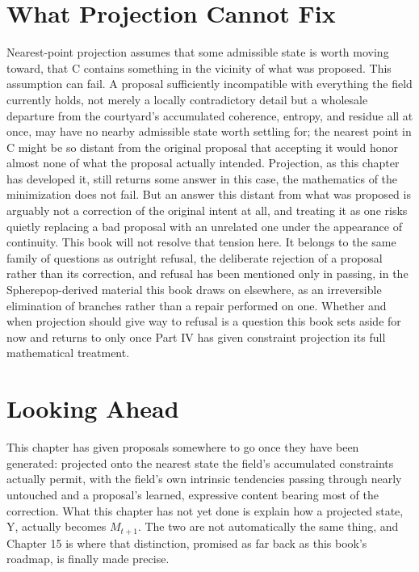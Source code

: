 \section{What Projection Cannot Fix}

Nearest-point projection assumes that some admissible state is worth moving toward, that C contains something in the vicinity of what was proposed. This assumption can fail. A proposal sufficiently incompatible with everything the field currently holds, not merely a locally contradictory detail but a wholesale departure from the courtyard's accumulated coherence, entropy, and residue all at once, may have no nearby admissible state worth settling for; the nearest point in C might be so distant from the original proposal that accepting it would honor almost none of what the proposal actually intended. Projection, as this chapter has developed it, still returns some answer in this case, the mathematics of the minimization does not fail. But an answer this distant from what was proposed is arguably not a correction of the original intent at all, and treating it as one risks quietly replacing a bad proposal with an unrelated one under the appearance of continuity. This book will not resolve that tension here. It belongs to the same family of questions as outright refusal, the deliberate rejection of a proposal rather than its correction, and refusal has been mentioned only in passing, in the Spherepop-derived material this book draws on elsewhere, as an irreversible elimination of branches rather than a repair performed on one. Whether and when projection should give way to refusal is a question this book sets aside for now and returns to only once Part IV has given constraint projection its full mathematical treatment.

\section{Looking Ahead}

This chapter has given proposals somewhere to go once they have been generated: projected onto the nearest state the field's accumulated constraints actually permit, with the field's own intrinsic tendencies passing through nearly untouched and a proposal's learned, expressive content bearing most of the correction. What this chapter has not yet done is explain how a projected state, Y, actually becomes \(M_{t+1}\). The two are not automatically the same thing, and Chapter 15 is where that distinction, promised as far back as this book's roadmap, is finally made precise.
